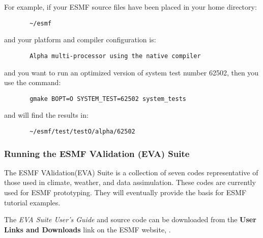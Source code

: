 For example, if your ESMF source files have been placed in your home directory:
\begin{verbatim}
       ~/esmf
\end{verbatim}

and your platform and compiler configuration is:
\begin{verbatim}
       Alpha multi-processor using the native compiler
\end{verbatim}

and you want to run an optimized version of system test number 62502,
then you use the command:
\begin{verbatim}
       gmake BOPT=O SYSTEM_TEST=62502 system_tests
\end{verbatim}

and will find the results in:
\begin{verbatim}
       ~/esmf/test/testO/alpha/62502 
\end{verbatim}

\subsubsection{Running the ESMF VAlidation (EVA) Suite}
\label{EVATestDescription}

The ESMF VAlidation(EVA) Suite is a collection of seven codes representative of those used 
in climate, weather, and data assimulation. These codes are currently used for ESMF 
prototyping.  They will eventually provide the basis for ESMF tutorial examples.

The {\it EVA Suite User's Guide} and source code can be downloaded from the {\bf
User Links and Downloads} link on the ESMF website, 
.




























